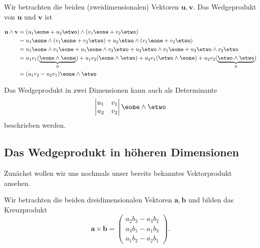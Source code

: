 \begin{definition}
  Wir betrachten die beiden (zweidimensionalen) Vektoren $\mathbf{u},
  \mathbf{v}$.
  Das Wedgeprodukt von $\mathbf{u}$ und $\mathbf{v}$ ist

  \begin{equation}
    \begin{aligned}
    \mathbf{u} \wedge \mathbf{v} &= (u_1 \eone + u_2 \etwo) \wedge
    (v_1 \eone + v_2 \etwo) \\
    &= u_1 \eone \wedge (v_1 \eone + v_2 \etwo) + u_2 \etwo \wedge (v_1 \eone + v_2 \etwo) \\
    &= u_1 \eone \wedge v_1 \eone + u_1 \eone \wedge v_2 \etwo + u_2 \etwo \wedge v_1 \eone + u_2 \etwo \wedge v_2 \etwo \\
    &= u_1 v_1 (\underbrace{\eone \wedge \eone}_{0}) + u_1 v_2 (\eone \wedge \etwo) + u_2 v_1 (\etwo \wedge \eone) + u_2 v_2 (\underbrace{\etwo \wedge \etwo}_{0}) \\
    &= (u_1 v_2 - u_2 v_1) \eone \wedge \etwo
    \end{aligned}
  \end{equation}
\end{definition}

Das Wedgeprodukt in zwei Dimensionen kann auch als Determinante
\begin{equation}
  \begin{vmatrix}
    u_1 & v_1 \\
    u_2 & v_2
  \end{vmatrix}
  \eone \wedge \etwo
\end{equation}
beschrieben werden.

\subsection{Das Wedgeprodukt in höheren Dimensionen}
Zunächst wollen wir uns nochmals unser bereits bekanntes
Vektorprodukt ansehen.
\begin{definition}
  Wir betrachten die beiden dreidimensionalen Vektoren $\mathbf{a}, \mathbf{b}$
  und bilden das Kreuzprodukt
  \begin{equation}
    \mathbf{a} \times \mathbf{b} = \begin{pmatrix} a_2 b_3 - a_3 b_2 \\ a_3 b_1 - a_1 b_3 \\ a_1 b_2 - a_2 b_1 \end{pmatrix}.
    \label{geoalgebra:eq:vektorprodukt}
  \end{equation}
  
\end{definition}

